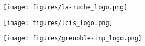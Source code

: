 \begin{frame}[plain]
      \maketitle\vspace{-0.8cm}
      \begin{figure}[ht!]
            \centering

            \centering
            \begin{minipage}{0.25\textwidth}
                \centering
                
            \end{minipage}\hfill
            \begin{minipage}{0.25\textwidth}
                \centering
                \texttt{[image: figures/la-ruche\_logo.png]}
            \end{minipage}\hfill
            \begin{minipage}{0.25\textwidth}
                \centering
                \texttt{[image: figures/lcis\_logo.png]}
            \end{minipage}\hfill
            \begin{minipage}{0.25\textwidth}
                \centering
                \texttt{[image: figures/grenoble-inp\_logo.png]}
            \end{minipage}





      \end{figure}
\end{frame}

